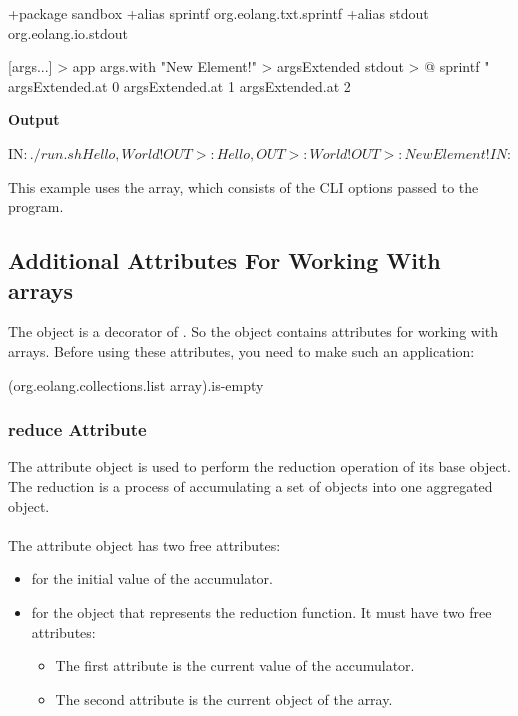 \documentclass[12pt]{book}
\begin{document}
{{{\begin{ffcode}
+package sandbox
+alias sprintf org.eolang.txt.sprintf
+alias stdout org.eolang.io.stdout

[args...] > app
  args.with "New Element!" > argsExtended
  stdout > @
    sprintf
      "%
      argsExtended.at 0
      argsExtended.at 1
      argsExtended.at 2

\end{ffcode}
\textbf{Output}
\begin{ffcode}
IN$: ./run.sh Hello, World!
OUT>: Hello,
OUT>: World!
OUT>: New Element!
IN$:
\end{ffcode}

This example uses the  array, which consists of the CLI options passed to the program.

\subsection{Additional Attributes For Working With arrays} \label{subsec:additional-arrays}

The object  is a decorator of . So the  object contains attributes for working with arrays. Before using these attributes, you need to make such an application:
\begin{ffcode}
    (org.eolang.collections.list array).is-empty
\end{ffcode}

\subsubsection{reduce Attribute}
The  attribute object is used to perform the reduction operation of its base  object. The reduction is a process of accumulating a set of objects into one aggregated object.
\\
\\
The  attribute object has two free attributes:
\begin{itemize}
    \item {} for the initial value of the accumulator.
    \item {} for the object that represents the reduction function. It must have two free attributes:
    \begin{itemize}
        \item The first attribute is the current value of the accumulator.
        \item The second attribute is the current object of the array.
    \end{itemize}
\end{itemize}

}}}
\end{document}

